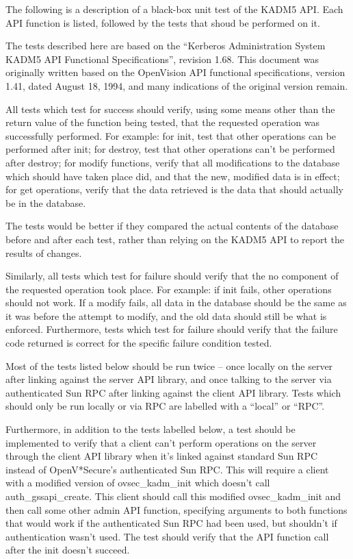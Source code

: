 The following is a description of a black-box unit test of the KADM5
API.  Each API function is listed, followed by the tests that shoud be
performed on it.

The tests described here are based on the ``Kerberos Administration
System KADM5 API Functional Specifications'', revision 1.68.  This
document was originally written based on the OpenVision API functional
specifications, version 1.41, dated August 18, 1994, and many
indications of the original version remain.

All tests which test for success should verify, using some means other
than the return value of the function being tested, that the requested
operation was successfully performed.  For example: for init, test
that other operations can be performed after init; for destroy, test
that other operations can't be performed after destroy; for modify
functions, verify that all modifications to the database which should
have taken place did, and that the new, modified data is in effect;
for get operations, verify that the data retrieved is the data that
should actually be in the database.

The tests would be better if they compared the actual contents of the
database before and after each test, rather than relying on the KADM5
API to report the results of changes.

Similarly, all tests which test for failure should verify that the
no component of the requested operation took place.  For example: if
init fails, other operations should not work.  If a modify fails, all
data in the database should be the same as it was before the attempt
to modify, and the old data should still be what is enforced.
Furthermore, tests which test for failure should verify that the
failure code returned is correct for the specific failure condition
tested.

Most of the tests listed below should be run twice -- once locally on
the server after linking against the server API library, and once
talking to the server via authenticated Sun RPC after linking against
the client API library.  Tests which should only be run locally or via
RPC are labelled with a ``local'' or ``RPC''.

Furthermore, in addition to the tests labelled below, a test should be
implemented to verify that a client can't perform operations on the
server through the client API library when it's linked against
standard Sun RPC instead of OpenV*Secure's authenticated Sun RPC.
This will require a client with a modified version of ovsec_kadm_init
which doesn't call auth_gssapi_create.  This client should call this
modified ovsec_kadm_init and then call some other admin API function,
specifying arguments to both functions that would work if the
authenticated Sun RPC had been used, but shouldn't if authentication
wasn't used.  The test should verify that the API function call after
the init doesn't succeed.

